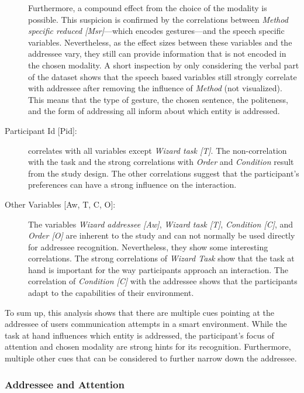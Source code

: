 \begin{description}
    Furthermore, a compound effect from the choice of the modality is possible.
    This suspicion is confirmed by the correlations between \emph{Method specific reduced [Msr]}---which encodes gestures---and the speech specific variables.
    Nevertheless, as the effect sizes between these variables and the \gls{addressee} vary, they still can provide information that is not encoded in the chosen modality.
    A short inspection by only considering the verbal part of the dataset shows that the speech based variables still strongly correlate with \gls{addressee} after removing the influence of \emph{Method} (not visualized).
    This means that the type of gesture, the chosen sentence, the politeness, and the form of addressing all inform about which entity is addressed.
    \item[{Participant Id [Pid]:}] correlates with all variables except \emph{Wizard task [T]}.
    The non-correlation with the task and the strong correlations with \emph{Order} and \emph{Condition} result from the study design.
    The other correlations suggest that the participant's preferences can have a strong influence on the interaction.
    \item[{Other Variables [Aw, T, C, O]:}] The variables \emph{Wizard \gls{addressee} [Aw]}, \emph{Wizard task [T]}, \emph{Condition [C]}, and \emph{Order [O]} are inherent to the study and can not normally be used directly for \gls{addressee} recognition.
    Nevertheless, they show some interesting correlations.
    The strong correlations of \emph{Wizard Task} show that the task at hand is important for the way participants approach an interaction.
    The correlation of \emph{Condition [C]} with the \gls{addressee} shows that the participants adapt to the capabilities of their environment.
\end{description}
To sum up, this analysis shows that there are multiple cues pointing at the \gls{addressee} of \naive{} users communication attempts in a \gls{smart environment}.
While the task at hand influences which entity is addressed, the participant's focus of attention and chosen modality are strong hints for its recognition.
Furthermore, multiple other cues that can be considered to further narrow down the \gls{addressee}.

\subsubsection{Addressee and Attention}\label{sec:addressee-equals-attention}

